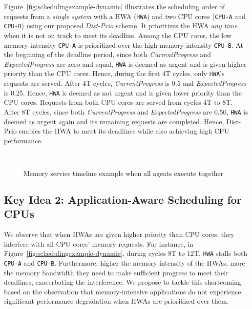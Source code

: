 \documentclass[10pt,letterpaper]{article}
\newcommand{\ca}[0]{\texttt{CPU-A}\xspace}
\newcommand{\cb}[0]{\texttt{CPU-B}\xspace}
\newcommand{\hwa}[0]{\texttt{HWA}\xspace}
\begin{document}
Figure~\ref{fig:schedulingexample-dynamic} illustrates the scheduling order of
requests from a \emph{single system} with a HWA (\hwa) and two CPU cores (\ca
and \cb) using our proposed \emph{Dist-Prio} scheme. It prioritizes the HWA \emph{any time}
when it is not on track to meet its deadline. Among the CPU cores, the low
memory-intensity \ca is prioritized over the high memory-intensity \cb. At the
beginning of the deadline period, since both {\it CurrentProgress} and {\it
ExpectedProgress} are zero and equal, \hwa is deemed as urgent and is given
higher priority than the CPU cores. Hence, during the first 4T cycles, only
\hwa's requests are served. After 4T cycles, {\it CurrentProgress} is 0.5 and
{\it ExpectedProgress} is 0.25.  Hence, \hwa is deemed as not urgent and is
given lower priority than the CPU cores. Requests from both CPU cores are
served from cycles 4T to 8T. After 8T cycles, since both {\it CurrentProgress}
and {\it ExpectedProgress} are 0.50, \hwa is deemed as urgent again and its
remaining requests are completed.
Hence, Dist-Prio enables the HWA to meet its deadlines while also achieving
high CPU performance.









\begin{figure}[t]
  \centering
{}
\\
\vspace{-2mm}
  \caption{Memory service timeline example when all agents execute together}
  \label{fig:schedulingexample}
\end{figure}

\subsection{Key Idea 2: Application-Aware Scheduling for CPUs}
\label{sec:obs1}

We observe that when HWAs are given higher priority than CPU cores, they interfere
with all CPU cores' memory requests. For instance, in
Figure~\ref{fig:schedulingexample-dynamic}, during cycles 8T to
12T, \hwa stalls both \ca and \cb. Furthermore, higher the
memory intensity of the HWAs, more the memory bandwidth they need
to make sufficient progress to meet their deadlines, exacerbating
the interference. We propose to tackle this shortcoming based on
the observation that memory-intensive applications do not
experience significant performance degradation when HWAs are
prioritized over them.
\end{document}
